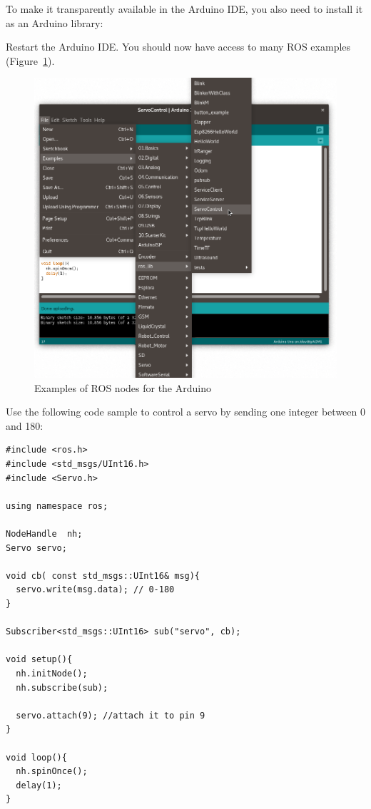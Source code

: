 \documentclass{instructions}
\begin{document}
To make it transparently available in the Arduino IDE, you also need to install
it as an Arduino library:


Restart the Arduino IDE. You should now have access to many ROS examples
(Figure~\ref{ros-arduino-examples}).

\begin{figure}[h!]
    \centering
    \includegraphics[width=0.56\linewidth]{arduino-ide-ros}
    \caption{Examples of ROS nodes for the Arduino}
    \label{ros-arduino-examples}
\end{figure}




Use the following code sample to control a servo by sending one integer between
0 and 180:

\begin{verbatim}
#include <ros.h>
#include <std_msgs/UInt16.h>
#include <Servo.h> 

using namespace ros;

NodeHandle  nh;
Servo servo;

void cb( const std_msgs::UInt16& msg){
  servo.write(msg.data); // 0-180
}

Subscriber<std_msgs::UInt16> sub("servo", cb);

void setup(){
  nh.initNode();
  nh.subscribe(sub);

  servo.attach(9); //attach it to pin 9
}

void loop(){
  nh.spinOnce();
  delay(1);
}

\end{verbatim}
\end{document}
